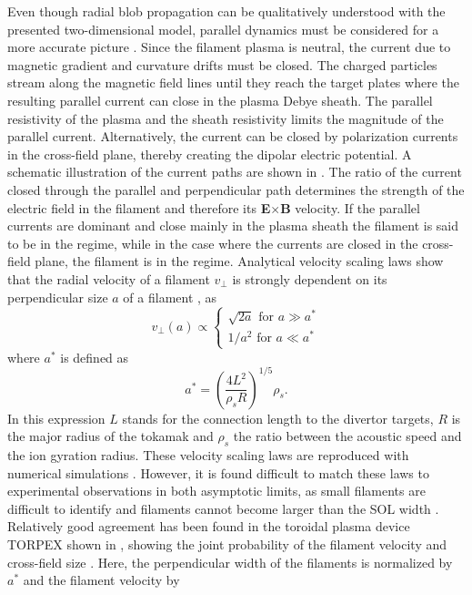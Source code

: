 Even though radial blob propagation can be qualitatively understood with the presented two-dimensional model, parallel dynamics must be considered for a more accurate picture \cite{krasheninnikov2008recent}. Since the filament plasma is neutral, the current due to magnetic gradient and curvature drifts must be closed. The charged particles stream along the magnetic field lines until they reach the target plates where the resulting parallel current can close in the plasma Debye sheath. The parallel resistivity of the plasma and the sheath resistivity  limits the magnitude of the parallel current. Alternatively, the current can be closed by polarization currents in the cross-field plane, thereby creating the dipolar electric potential. A schematic illustration of the current paths are shown in . The ratio of the current closed through the parallel and perpendicular path determines the strength of the electric field in the filament and therefore its \textbf{E}$\times$\textbf{B} velocity. If the parallel currents are dominant and close mainly in the plasma sheath the filament is said to be in the  regime, while in the case where the currents are closed in the cross-field plane, the filament is in the  regime. Analytical velocity scaling laws show that the radial velocity of a filament $v_\perp$ is strongly dependent on its perpendicular size $a$ of a filament \cite{theiler2009cross, angus2012effects}, as
\begin{equation}
	v_\perp(a)  \propto	\begin{cases} 
		\sqrt{2 a} \,\, \textrm{for}\,\, a \gg a^*\\
		1/a^2 \,\, \textrm{for}\,\, a \ll a^*
	\end{cases}	
\end{equation}
where $a^*$ is defined as 
\begin{equation}
	a^* = \left(\frac{4 L^2}{\rho_s R}\right)^{1/5}\rho_s.
\end{equation}
In this expression $L$ stands for the connection length to the divertor targets, $R$ is the major radius of the tokamak and $\rho_s$ the ratio between the acoustic speed and the ion gyration radius. These velocity scaling laws are reproduced with numerical simulations \cite{garcia2006radial,kube2012effect,kube2016amplitude}. However, it is found difficult to match these laws to experimental observations in both asymptotic limits, as small filaments are difficult to identify and filaments cannot become larger than the SOL width \cite{myra2006blob,kube2013blob}. Relatively good agreement has been found in the toroidal plasma device TORPEX shown in , showing the joint probability of the filament velocity and cross-field size \cite{theiler2009cross}. Here, the perpendicular width of the filaments is normalized by $a^*$ and the filament velocity by
